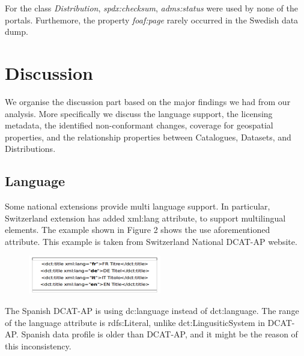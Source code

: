 \documentclass[<options>]{elsarticle}
\begin{document}
For the class \textit{Distribution}, \textit{spdx:checksum}, \textit{adms:status} were used by none of the portals. Furthemore, the property \textit{foaf:page} rarely occurred in the Swedish data dump.

\section{Discussion}
We organise the discussion part based on the major findings we had from our analysis. More specifically we discuss the language support, the licensing metadata, the identified non-conformant changes, coverage for geospatial properties, and the relationship properties between Catalogues, Datasets, and Distributions.

\subsection{Language}
Some national extensions provide multi language support. In particular, Switzerland extension has added xml:lang attribute, to support multilingual elements. The example shown in Figure 2 shows the use aforementioned attribute. This example is taken from Switzerland National DCAT-AP website.

\begin{figure}[H]
\includegraphics{replace26.png}
\end{figure}

The Spanish DCAT-AP is using dc:language instead of  dct:language. The range of the language attribute is rdfs:Literal, unlike dct:LingusiticSystem in DCAT-AP. Spanish data profile is older than DCAT-AP, and it might be the reason of this inconsistency.  
\end{document}
